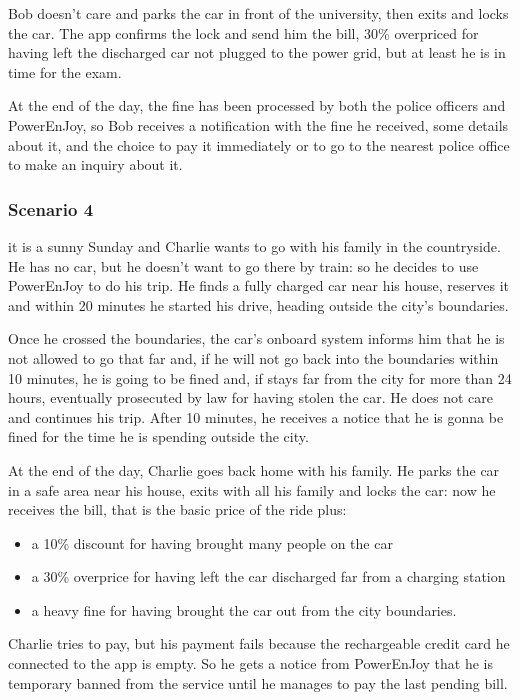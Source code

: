 \documentclass[11pt]{article} %
\newcommand{\pe}{PowerEnJoy }
\newcommand{\pecomma}{PowerEnJoy, }
\begin{document}
Bob doesn't care and parks the car in front of the university, then exits and locks the car. The app confirms the lock and send him the bill, 30\% overpriced for having left the discharged car not plugged to the power grid, but at least he is in time for the exam.

At the end of the day, the fine has been processed by both the police officers and \pecomma so Bob receives a notification with the fine he received, some details about it, and the choice to pay it immediately or to go to the nearest police office to make an inquiry about it.


\subsubsection{Scenario 4}
it is a sunny Sunday and Charlie wants to go with his family in the countryside. He has no car, but he doesn't want to go there by train: so he decides to use \pe to do his trip. He finds a fully charged car near his house, reserves it and within 20 minutes he started his drive, heading outside the city's boundaries.

Once he crossed the boundaries, the car's onboard system informs him that he is not allowed to go that far and, if he will not go back into the boundaries within 10 minutes, he is going to be fined and, if stays far from the city for more than 24 hours, eventually prosecuted by law for having stolen the car. He does not care and continues his trip. After 10 minutes, he receives a notice that he is gonna be fined for the time he is spending outside the city.

At the end of the day, Charlie goes back home with his family. He parks the car in a safe area near his house, exits with all his family and locks the car: now he receives the bill, that is the basic price of the ride plus:
\begin{itemize}
	\item a 10\% discount for having brought many people on the car
	\item a 30\% overprice for having left the car discharged far from a charging station
	\item a heavy fine for having brought the car out from the city boundaries.
\end{itemize}
Charlie tries to pay, but his payment fails because the rechargeable credit card he connected to the app is empty. So he gets a notice from \pe that he is temporary banned from the service until he manages to pay the last pending bill.
\end{document}

